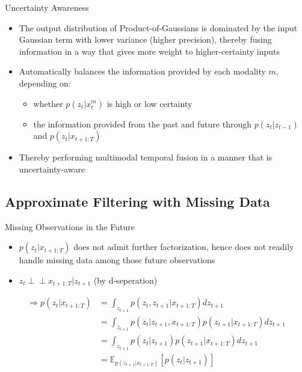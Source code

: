 \documentclass{beamer}
\begin{document}
\begin{frame}{Uncertainty Awareness}
\begin{itemize}
\item The output distribution of Product-of-Gaussians is dominated by the input Gaussian term with lower variance (higher precision), thereby fusing information in a way that gives more weight to higher-certainty inputs
\item Automatically balances the information provided by each modality $m$, depending on:
\begin{itemize}
\item whether $p(z_t|x_t^m)$ is high or low certainty
\item the information provided from the past and future through $p(z_t|z_{t-1})$ and $p(z_t|x_{t+1:T})$
\end{itemize}
\item Thereby performing multimodal temporal fusion in a manner that is uncertainty-aware
\end{itemize}
\end{frame}

\subsection{Approximate Filtering with Missing Data}
\begin{frame}{Missing Observations in the Future}
\begin{itemize}
\item $p(z_t|x_{t+1:T})$ does not admit further factorization, hence does not readily handle missing data among those future observations
\item $z_t\perp\!\!\!\perp x_{t+1:T}|z_{t+1}$ (by d-seperation)
\end{itemize}
\[
\begin{split}
\Rightarrow p(z_t|x_{t+1:T})&=\int_{z_{t+1}}p(z_t,z_{t+1}|x_{t+1:T})dz_{t+1}\\
&=\int_{z_{t+1}}p(z_t|z_{t+1},x_{t+1:T})p(z_{t+1}|x_{t+1:T})dz_{t+1}\\
&=\int_{z_{t+1}}p(z_t|z_{t+1})p(z_{t+1}|x_{t+1:T})dz_{t+1}\\
&=\mathbb{E}_{p(z_{t+1}|x_{t+1:T})}[p(z_t|z_{t+1})]
\end{split}
\]
\end{frame}
\end{document}
